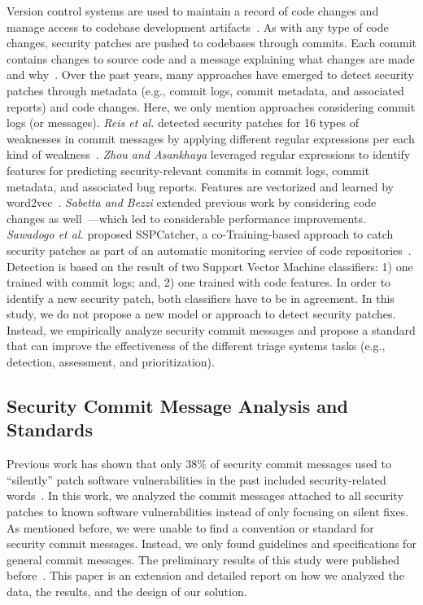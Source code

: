 Version control systems are used to maintain a record of code changes
and manage access to codebase development artifacts~\cite{10.1145/2950290.2950364}. As with any type of code changes, security patches are pushed to codebases through commits. Each commit contains changes to source code and a message explaining what changes
are made and why~\cite{883028,Tian_2022}. Over the past years, many approaches have emerged to detect security patches through metadata (e.g., commit logs, commit metadata, and associated reports) and code changes. Here, we only
mention approaches considering commit logs (or messages).
\emph{Reis et al.} detected security patches for 16 types of weaknesses in commit messages by applying different regular expressions per each kind of weakness~\cite{reis2017secbench}.
\emph{Zhou and Asankhaya}  leveraged regular expressions to identify
features for predicting security-relevant commits in commit logs,
commit metadata, and associated bug reports. Features are vectorized and learned by word2vec~\cite{10.1145/3106237.3117771}. 
\emph{Sabetta and Bezzi} extended previous work by considering code changes as well~\cite{DBLP:journals/corr/abs-1807-02458}---which led to considerable performance improvements.
\emph{Sawadogo et al.} proposed SSPCatcher, a co-Training-based approach to catch
security patches as part of an automatic monitoring service of code repositories~\cite{SSPatcher2022}. Detection is based on the result of two Support Vector Machine classifiers: 1) one trained with commit logs; and, 2) one trained with code features. In order to identify a new security patch, both 
classifiers have to be in agreement. In this study, we do not propose a new model or approach to detect security patches. Instead, we empirically analyze security commit messages and propose a standard that can improve the effectiveness of the different triage systems tasks (e.g., detection, assessment, and prioritization).

\subsection{Security Commit Message Analysis and Standards}

Previous work has shown that only $38\%$ of security commit messages used to ``silently'' patch software vulnerabilities in the past included security-related words~\cite{9678720}. In this work, 
we analyzed the commit messages attached to all security patches to known software vulnerabilities instead of only focusing on silent fixes. As mentioned before, we were unable 
to find a convention or standard for security commit messages. Instead, we only 
found guidelines and specifications for general commit messages. The preliminary results
of this study were published before~\cite{9796324}. This paper is an extension and 
detailed report on how we analyzed the data, the results, and the design of our solution.

